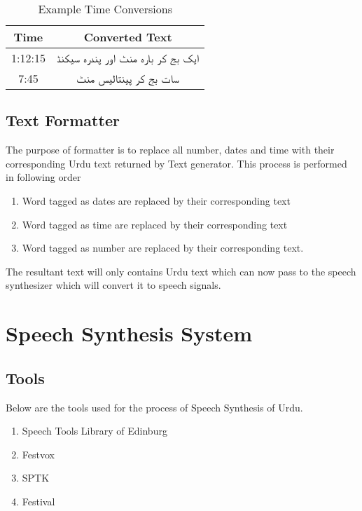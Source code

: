 \begin{itemize}
\begin{table}[]
\centering
\begin{tabular}{|c|c|}
\hline
\textbf{Time} & \textbf{Converted Text}                        \\ \hline
1:12:15       & \texturdu{ایک بج کر  بارہ منٹ اور پندرہ سیکنڈ} \\ \hline
7:45          & \texturdu{سات بج کر پینتالیس منٹ}              \\ \hline
\end{tabular}
\caption{Example Time Conversions}
\label{table:example_time_conversion}
\end{table}

\subsection{Text Formatter}
The purpose of formatter is to replace all number, dates and time with their corresponding Urdu text returned by Text generator. 
This process is performed in following order
\begin{enumerate}
  \item Word tagged as dates are replaced by their corresponding text
  \item Word tagged as time are replaced by their corresponding text
  \item Word tagged as number are replaced by their corresponding text. 
\end{enumerate}
The resultant text will only contains Urdu text which can now pass to the speech synthesizer which will convert it to speech signals. 

\section{Speech Synthesis System}

\subsection{Tools}

Below are the tools used for the process of Speech Synthesis of Urdu.

\begin{enumerate}
  \item Speech Tools Library of Edinburg
  \item Festvox
  \item SPTK
  \item Festival
\end{enumerate}


\end{itemize}
